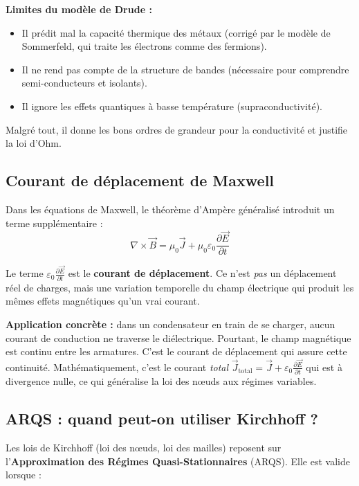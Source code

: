 \documentclass[12pt,a4paper,twoside]{book}
\begin{document}
\begin{attention}
\textbf{Limites du modèle de Drude :}
\begin{itemize}[nosep]
\item Il prédit mal la capacité thermique des métaux (corrigé par le modèle de Sommerfeld, qui traite les électrons comme des fermions).
\item Il ne rend pas compte de la structure de bandes (nécessaire pour comprendre semi-conducteurs et isolants).
\item Il ignore les effets quantiques à basse température (supraconductivité).
\end{itemize}
Malgré tout, il donne les bons ordres de grandeur pour la conductivité et justifie la loi d'Ohm.
\end{attention}

\subsection{Courant de déplacement de Maxwell}

Dans les équations de Maxwell, le théorème d'Ampère généralisé introduit un terme supplémentaire :
\[
\nabla \times \vec{B} = \mu_0 \vec{J} + \mu_0 \varepsilon_0 \frac{\partial \vec{E}}{\partial t}
\]

Le terme $\varepsilon_0 \frac{\partial \vec{E}}{\partial t}$ est le \textbf{courant de déplacement}. Ce n'est \textit{pas} un déplacement réel de charges, mais une variation temporelle du champ électrique qui produit les mêmes effets magnétiques qu'un vrai courant.

\begin{pratique}
\textbf{Application concrète :} dans un condensateur en train de se charger, aucun courant de conduction ne traverse le diélectrique. Pourtant, le champ magnétique est continu entre les armatures. C'est le courant de déplacement qui assure cette continuité. Mathématiquement, c'est le courant \textit{total} $\vec{J}_{\text{total}} = \vec{J} + \varepsilon_0 \frac{\partial \vec{E}}{\partial t}$ qui est à divergence nulle, ce qui généralise la loi des n\oe uds aux régimes variables.
\end{pratique}

\subsection{ARQS : quand peut-on utiliser Kirchhoff ?}

Les lois de Kirchhoff (loi des n\oe uds, loi des mailles) reposent sur l'\textbf{Approximation des Régimes Quasi-Stationnaires} (ARQS). Elle est valide lorsque :
\end{document}
